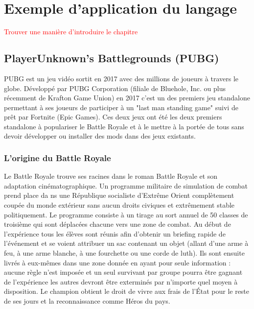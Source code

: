 \chapter{Exemple d'application du langage}
\textcolor{red}{Trouver une manière d'introduire le chapitre}
\section{PlayerUnknown's Battlegrounds (PUBG)\cite{wikipubg}}

PUBG est un jeu vidéo sortit en 2017 avec des millions de joueurs à travers le globe. Développé par PUBG Corporation (filiale de Bluehole, Inc. ou plus récemment de Krafton Game Union) en 2017 c'est un des premiers jeu standalone permettant à ses joueurs de participer à un "last man standing game" suivi de prêt par Fortnite (Epic Games). Ces deux jeux ont été les deux premiers standalone à populariser le Battle Royale et à le mettre à la portée de tous sans devoir développer ou installer des mods dans des jeux existants.

\subsection{L'origine du Battle Royale}
Le Battle Royale trouve ses racines dans le roman Battle Royale et son adaptation cinématographique. Un programme militaire de simulation de combat prend place da ns une République socialiste d'Extrême Orient complètement coupée du monde extérieur sans aucun droits civiques et extrêmement stable politiquement. Le programme consiste à un tirage au sort annuel de 50 classes de troisième qui sont déplacées chacune vers une zone de combat. Au début de l'expérience tous les élèves sont réunis afin d'obtenir un briefing rapide de l'événement et se voient attribuer un sac contenant un objet (allant d'une arme à feu, à une arme blanche, à une fourchette ou une corde de luth). Ils sont ensuite livrés à eux-mêmes dans une zone donnée en ayant pour seule information : aucune règle n'est imposée et un seul survivant par groupe pourra être gagnant de l'expérience les autres devront être exterminés par n'importe quel moyen à disposition. Le champion obtient le droit de vivre aux frais de l'État pour le reste de ses jours et la reconnaissance comme Héros du pays.

